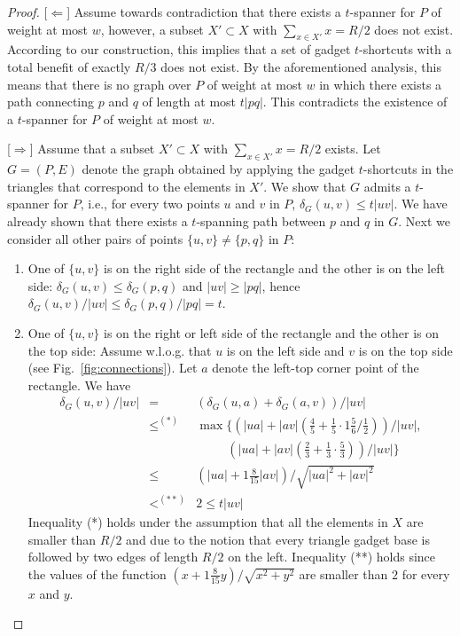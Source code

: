 \documentclass[a4paper]{llncs}
\begin{document}
\begin{proof}

[$\Leftarrow$] Assume towards contradiction that 
there exists a $t$-spanner for $P$ of weight at most $w$, however, 
a subset $X'\subset X$ with $\sum_{x \in X'} x =R/2$ does not exist. 
According to our construction, this implies that a set of gadget $t$-shortcuts 
with a total benefit of exactly $R/3$ does not exist. 
By the aforementioned analysis, this means that there is no graph over $P$
of weight at most $w$ in which there exists a path connecting $p$ and $q$ of length at most $t|pq|$.
This contradicts the existence of a $t$-spanner for $P$ of weight at most $w$.

[$\Rightarrow$] Assume that a subset $X'\subset X$ with $\sum_{x \in X'} x =R/2$ exists.
Let $G=(P,E)$ denote the graph obtained by applying the gadget $t$-shortcuts
in the triangles that correspond to the elements in $X'$.
We show that $G$ admits a $t$-spanner for $P$, i.e., 
for every two points $u$ and $v$ in $P$, $\delta_G(u,v)\leq t|uv|$.
We have already shown that there exists a $t$-spanning path between $p$ and $q$ in $G$.
Next we consider all other pairs of points $\{u,v\}\neq \{p,q\}$ in $P$:
\begin{enumerate}

\item One of $\{u,v\}$ is on the right side of the rectangle and the other is on the left side:
$\delta_G(u,v) \leq \delta_G(p,q)$ and $|uv| \geq |pq|$, hence $\delta_G(u,v)/|uv| \leq \delta_G(p,q)/|pq| = t$.

\item One of $\{u,v\}$ is on the right or left side of the rectangle and the other is on the top side:
Assume w.l.o.g. that $u$ is on the left side and $v$ is on the top side (see Fig.~\ref{fig:connections}). 
Let $a$ denote the left-top corner point of the rectangle.
We have
\begin{eqnarray*}
\delta_G(u,v)/|uv|&=& (\delta_G(u,a)+\delta_G(a,v))/|uv|\\
							&\leq^{(*)}& \max\{(|ua|+|av|(\frac{4}{5}+\frac{1}{5}\cdot 1\frac{5}{6}/\frac{1}{2}))/|uv|,\\ 
													&& \;\;\;\;\;\;\;\;\;(|ua|+|av|(\frac{2}{3}+\frac{1}{3}\cdot \frac{5}{3}))/|uv|\}\\
							&\leq& (|ua| + 1\frac{8}{15}|av|)/\sqrt{|ua|^2+|av|^2} \\
							&<^{(**)}& 2 \leq t|uv|
\end{eqnarray*}
Inequality (*) holds under the assumption that all the elements in $X$ are
smaller than $R/2$ and due to the notion that
every triangle gadget base is followed by two edges of length $R/2$ on the left.
Inequality (**) holds since the values of the function $(x + 1\frac{8}{15}y)/\sqrt{x^2+y^2}$
are smaller than $2$ for every $x$ and $y$.


\end{enumerate}
\end{proof}
\end{document}
